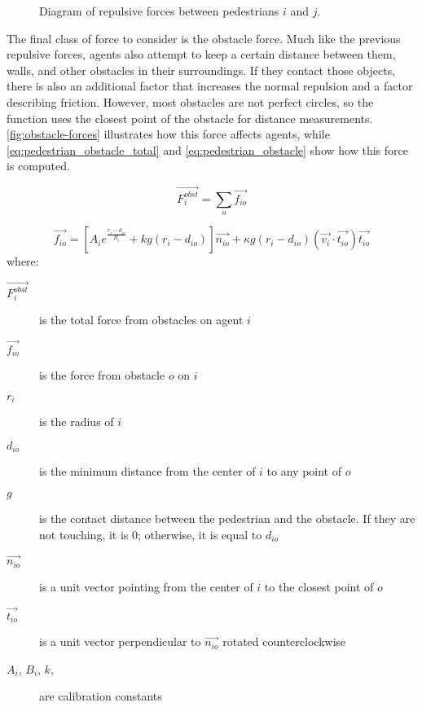 \documentclass[twoside, 11pt]{article}
\begin{document}
\begin{figure}[h]
  \centering
  
  \caption[Diagram of repulsive forces between pedestrians $i$ and $j$]{Diagram of repulsive forces between pedestrians $i$ and $j$.}
  \label{fig:repulsive-forces}
\end{figure}

The final class of force to consider is the obstacle force. Much like the previous repulsive forces, agents also attempt to keep a certain distance between them, walls, and other obstacles in their surroundings. If they contact those objects, there is also an additional factor that increases the normal repulsion and a factor describing friction. However, most obstacles are not perfect circles, so the function uses the closest point of the obstacle for distance measurements. \autoref{fig:obstacle-forces} illustrates how this force affects agents, while \autoref{eq:pedestrian_obstacle_total} and \autoref{eq:pedestrian_obstacle} show how this force is computed.

\begin{equation}
  \vec{F_i^{obst}} = \sum_o\vec{f_{io}}
  \label{eq:pedestrian_obstacle_total}
\end{equation}

\begin{equation}
  \vec{f_{io}} = [A_ie^{\frac{r_i - d_{io}}{B_i}} + kg(r_i-d_{io})]\vec{n_{io}} + \kappa g (r_i - d_{io})(\vec{v_i} \cdot \vec{t_{io}})\vec{t_{io}}
  \label{eq:pedestrian_obstacle}
\end{equation}
where:
\begin{description}
  \item[$\vec{F_i^{obst}}$] is the total force from obstacles on agent $i$
  \item[$\vec{f_{io}}$] is the force from obstacle $o$ on $i$
  \item[$r_i$] is the radius of $i$
  \item[$d_{io}$] is the minimum distance from the center of $i$ to any point of $o$
  \item[$g$] is the contact distance between the pedestrian and the obstacle. If they are not touching, it is $0$; otherwise, it is equal to $d_{io}$
  \item[$\vec{n_{io}}$] is a unit vector pointing from the center of $i$ to the closest point of $o$
  \item[$\vec{t_{io}}$] is a unit vector perpendicular to $\vec{n_{io}}$ rotated counterclockwise
  \item[$A_i$, $B_i$, $k$, \kappa] are calibration constants
\end{description}
\end{document}
